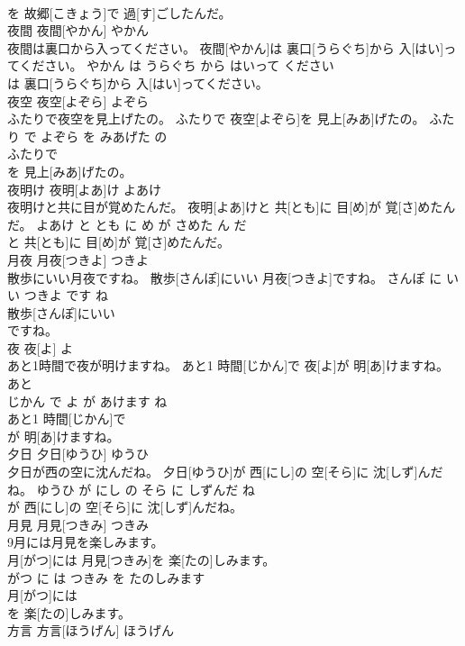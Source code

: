 \documentclass[8pt]{extreport}
\begin{document}
\begin{CJK}{UTF8}{min}
\\	を 故郷[こきょう]で 過[す]ごしたんだ。			
\\	夜間	夜間[やかん]	やかん	
\\	夜間は裏口から入ってください。	夜間[やかん]は 裏口[うらぐち]から 入[はい]ってください。	やかん は うらぐち から はいって ください	
\\	は 裏口[うらぐち]から 入[はい]ってください。			
\\	夜空	夜空[よぞら]	よぞら	
\\	ふたりで夜空を見上げたの。	ふたりで 夜空[よぞら]を 見上[みあ]げたの。	ふたり で よぞら を みあげた の	
\\	ふたりで
\\	を 見上[みあ]げたの。			
\\	夜明け	夜明[よあ]け	よあけ	
\\	夜明けと共に目が覚めたんだ。	夜明[よあ]けと 共[とも]に 目[め]が 覚[さ]めたんだ。	よあけ と とも に め が さめた ん だ	
\\	と 共[とも]に 目[め]が 覚[さ]めたんだ。			
\\	月夜	月夜[つきよ]	つきよ	
\\	散歩にいい月夜ですね。	散歩[さんぽ]にいい 月夜[つきよ]ですね。	さんぽ に いい つきよ です ね	
\\	散歩[さんぽ]にいい
\\	ですね。			
\\	夜	夜[よ]	よ	
\\	あと1時間で夜が明けますね。	あと1 時間[じかん]で 夜[よ]が 明[あ]けますね。	あと 
\\	じかん で よ が あけます ね	
\\	あと1 時間[じかん]で
\\	が 明[あ]けますね。			
\\	夕日	夕日[ゆうひ]	ゆうひ	
\\	夕日が西の空に沈んだね。	夕日[ゆうひ]が 西[にし]の 空[そら]に 沈[しず]んだね。	ゆうひ が にし の そら に しずんだ ね	
\\	が 西[にし]の 空[そら]に 沈[しず]んだね。			
\\	月見	月見[つきみ]	つきみ	
\\	9月には月見を楽しみます。	
\\	月[がつ]には 月見[つきみ]を 楽[たの]しみます。	
\\	がつ に は つきみ を たのしみます	
\\	月[がつ]には
\\	を 楽[たの]しみます。			
\\	方言	方言[ほうげん]	ほうげん	

\end{CJK}
\end{document}
